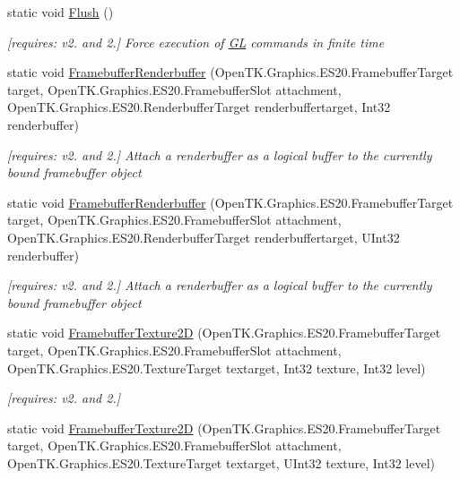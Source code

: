 \begin{DoxyCompactItemize}
static void \hyperlink{class_open_t_k_1_1_graphics_1_1_e_s20_1_1_g_l_a57735b924211e1a43f7e15fff122d3fa}{Flush} ()
\begin{DoxyCompactList}\small\item\em \mbox{[}requires\-: v2. and 2.\mbox{]} Force execution of \hyperlink{class_open_t_k_1_1_graphics_1_1_e_s20_1_1_g_l}{G\-L} commands in finite time \end{DoxyCompactList}\item 
static void \hyperlink{class_open_t_k_1_1_graphics_1_1_e_s20_1_1_g_l_ae84f9d977e8daba8a65141659380a084}{Framebuffer\-Renderbuffer} (Open\-T\-K.\-Graphics.\-E\-S20.\-Framebuffer\-Target target, Open\-T\-K.\-Graphics.\-E\-S20.\-Framebuffer\-Slot attachment, Open\-T\-K.\-Graphics.\-E\-S20.\-Renderbuffer\-Target renderbuffertarget, Int32 renderbuffer)
\begin{DoxyCompactList}\small\item\em \mbox{[}requires\-: v2. and 2.\mbox{]} Attach a renderbuffer as a logical buffer to the currently bound framebuffer object \end{DoxyCompactList}\item 
static void \hyperlink{class_open_t_k_1_1_graphics_1_1_e_s20_1_1_g_l_a244faf59f81e7ce9c102089a2175b290}{Framebuffer\-Renderbuffer} (Open\-T\-K.\-Graphics.\-E\-S20.\-Framebuffer\-Target target, Open\-T\-K.\-Graphics.\-E\-S20.\-Framebuffer\-Slot attachment, Open\-T\-K.\-Graphics.\-E\-S20.\-Renderbuffer\-Target renderbuffertarget, U\-Int32 renderbuffer)
\begin{DoxyCompactList}\small\item\em \mbox{[}requires\-: v2. and 2.\mbox{]} Attach a renderbuffer as a logical buffer to the currently bound framebuffer object \end{DoxyCompactList}\item 
static void \hyperlink{class_open_t_k_1_1_graphics_1_1_e_s20_1_1_g_l_a1f0453935cc418cea814bac5817a8be2}{Framebuffer\-Texture2\-D} (Open\-T\-K.\-Graphics.\-E\-S20.\-Framebuffer\-Target target, Open\-T\-K.\-Graphics.\-E\-S20.\-Framebuffer\-Slot attachment, Open\-T\-K.\-Graphics.\-E\-S20.\-Texture\-Target textarget, Int32 texture, Int32 level)
\begin{DoxyCompactList}\small\item\em \mbox{[}requires\-: v2. and 2.\mbox{]}\end{DoxyCompactList}\item 
static void \hyperlink{class_open_t_k_1_1_graphics_1_1_e_s20_1_1_g_l_a479cb16cabc59ebf2176228cb4ec8582}{Framebuffer\-Texture2\-D} (Open\-T\-K.\-Graphics.\-E\-S20.\-Framebuffer\-Target target, Open\-T\-K.\-Graphics.\-E\-S20.\-Framebuffer\-Slot attachment, Open\-T\-K.\-Graphics.\-E\-S20.\-Texture\-Target textarget, U\-Int32 texture, Int32 level)

\end{DoxyCompactItemize}
